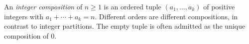 
An \emph{integer composition} of $n\ge1$ is an ordered tuple $(a_1,\ldots,a_k)$ of positive integers with $a_1+\cdots+a_k=n$. Different orders are different compositions, in contrast to integer partitions. The empty tuple is often admitted as the unique composition of $0$.

